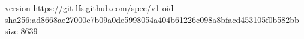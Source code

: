 version https://git-lfs.github.com/spec/v1
oid sha256:ad8668ae27000c7b09a0de5998054a404b61226c098a8bfacd453105f0b582bb
size 8639
